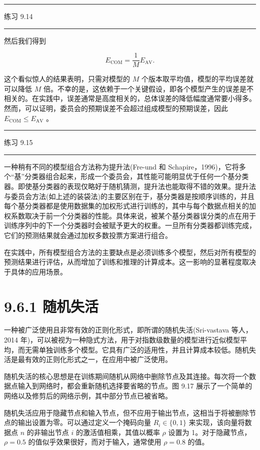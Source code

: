 \documentclass[10pt]{article}
\newcommand{\HRule}{\begin{center}\rule{0.9\linewidth}{0.2mm}\end{center}}
\begin{document}
\HRule

练习 9.14

\HRule

然后我们得到

\[
{E}_{\mathrm{{COM}}} = \frac{1}{M}{E}_{\mathrm{{AV}}}. \tag{9.50}
\]

这个看似惊人的结果表明，只需对模型的 \(M\) 个版本取平均值，模型的平均误差就可以降低 \(M\) 倍。不幸的是，这依赖于一个关键假设，即各个模型产生的误差是不相关的。在实践中，误差通常是高度相关的，总体误差的降低幅度通常要小得多。然而，可以证明，委员会的预期误差不会超过组成模型的预期误差，因此 \({E}_{\mathrm{{COM}}} \leq  {E}_{\mathrm{{AV}}}\) 。

\HRule

练习 9.15

\HRule

一种稍有不同的模型组合方法称为提升法(Fre-und 和 Schapire，1996)，它将多个“基”分类器组合起来，形成一个委员会，其性能可能明显优于任何一个基分类器。即使基分类器的表现仅略好于随机猜测，提升法也能取得不错的效果。提升法与委员会方法(如上述的装袋法)的主要区别在于，基分类器是按顺序训练的，并且每个基分类器都是使用数据集的加权形式进行训练的，其中与每个数据点相关的加权系数取决于前一个分类器的性能。具体来说，被某个基分类器误分类的点在用于训练序列中的下一个分类器时会被赋予更大的权重。一旦所有分类器都训练完成，它们的预测结果就会通过加权多数投票方案进行组合。

在实践中，所有模型组合方法的主要缺点是必须训练多个模型，然后对所有模型的预测结果进行评估，从而增加了训练和推理的计算成本。这一影响的显著程度取决于具体的应用场景。

\section*{9.6.1 随机失活}

一种被广泛使用且非常有效的正则化形式，即所谓的随机失活(Sri-vastava 等人，2014 年)，可以被视为一种隐式方法，用于对指数级数量的模型进行近似模型平均，而无需单独训练多个模型。它具有广泛的适用性，并且计算成本较低。随机失活是最有效的正则化形式之一，在应用中被广泛使用。

随机失活的核心思想是在训练期间随机从网络中删除节点及其连接。每次将一个数据点输入到网络时，都会重新随机选择要省略的节点。图 9.17 展示了一个简单的网络以及修剪后的网络示例，其中部分节点已被省略。

随机失活应用于隐藏节点和输入节点，但不应用于输出节点，这相当于将被删除节点的输出设置为零。可以通过定义一个掩码向量 \({R}_{i} \in  \{ 0,1\}\) 来实现，该向量将数据点 \(n\) 的非输出节点 \(i\) 的激活值相乘，其值以概率 \(\rho\) 设置为 1。对于隐藏节点， \(\rho  = {0.5}\) 的值似乎效果很好，而对于输入，通常使用 \(\rho  = {0.8}\) 的值。
\end{document}
